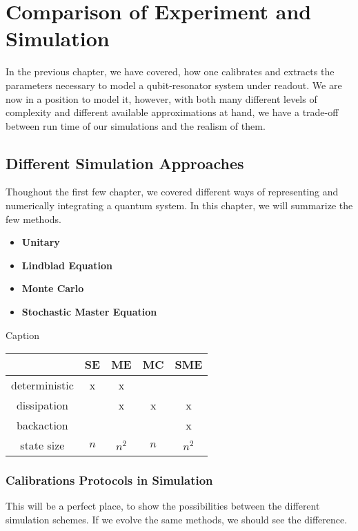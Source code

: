 \chapter{Comparison of Experiment and Simulation}
In the previous chapter, we have covered, how one calibrates and extracts the parameters necessary to model a qubit-resonator system under readout. We are now in a position to model it, however, with both many different levels of complexity and different available approximations at hand, we have a trade-off between run time of our simulations and the realism of them. 

\section{Different Simulation Approaches}
Thoughout the first few chapter, we covered different ways of representing and numerically integrating a quantum system. In this chapter, we will summarize the few methods.

\begin{itemize}
    \item \textbf{Unitary}
    \item \textbf{Lindblad Equation}
    \item \textbf{Monte Carlo}
    \item \textbf{Stochastic Master Equation}
\end{itemize}


\begin{margintable}
    \caption{Caption}
    \centering
    \begin{tabular}{c|c|c|c|c}
                    &  SE   & ME    & MC    & SME \\ \hline 
    deterministic   & x     & x     &       &      \\
    dissipation     &       & x     & x     & x    \\ 
    backaction      &       &       &       & x    \\
    state size      & $n$   & $n^2$ & $n$   & $n^2$
    \end{tabular}
    \label{tab:my_label}
\end{margintable}

\subsection{Calibrations Protocols in Simulation}
This will be a perfect place, to show the possibilities between the different simulation schemes. If we evolve the same methods, we should see the difference. 

